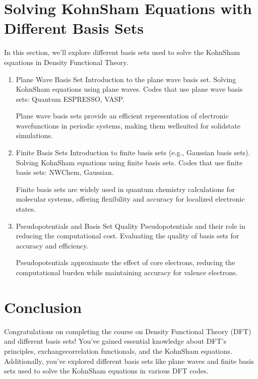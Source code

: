 \documentclass[letterpaper,10pt,english]{sphinxmanual}
\begin{document}
\section{Solving Kohn\sphinxhyphen{}Sham Equations with Different Basis Sets}
\label{\detokenize{dft/dft:solving-kohn-sham-equations-with-different-basis-sets}}
\sphinxAtStartPar
In this section, we’ll explore different basis sets used to solve the Kohn\sphinxhyphen{}Sham equations in Density Functional Theory.
\begin{enumerate}
%
\item {} 
\sphinxAtStartPar
Plane Wave Basis Set
\sphinxhyphen{} Introduction to the plane wave basis set.
\sphinxhyphen{} Solving Kohn\sphinxhyphen{}Sham equations using plane waves.
\sphinxhyphen{} Codes that use plane wave basis sets: Quantum ESPRESSO, VASP.

\sphinxAtStartPar
Plane wave basis sets provide an efficient representation of electronic wavefunctions in periodic systems, making them well\sphinxhyphen{}suited for solid\sphinxhyphen{}state simulations.

\item {} 
\sphinxAtStartPar
Finite Basis Sets
\sphinxhyphen{} Introduction to finite basis sets (e.g., Gaussian basis sets).
\sphinxhyphen{} Solving Kohn\sphinxhyphen{}Sham equations using finite basis sets.
\sphinxhyphen{} Codes that use finite basis sets: NWChem, Gaussian.

\sphinxAtStartPar
Finite basis sets are widely used in quantum chemistry calculations for molecular systems, offering flexibility and accuracy for localized electronic states.

\item {} 
\sphinxAtStartPar
Pseudopotentials and Basis Set Quality
\sphinxhyphen{} Pseudopotentials and their role in reducing the computational cost.
\sphinxhyphen{} Evaluating the quality of basis sets for accuracy and efficiency.

\sphinxAtStartPar
Pseudopotentials approximate the effect of core electrons, reducing the computational burden while maintaining accuracy for valence electrons.

\end{enumerate}


\section{Conclusion}
\label{\detokenize{dft/dft:conclusion}}
\sphinxAtStartPar
Congratulations on completing the course on Density Functional Theory (DFT) and different basis sets! You’ve gained essential knowledge about DFT’s principles, exchange\sphinxhyphen{}correlation functionals, and the Kohn\sphinxhyphen{}Sham equations. Additionally, you’ve explored different basis sets like plane waves and finite basis sets used to solve the Kohn\sphinxhyphen{}Sham equations in various DFT codes.
\end{document}
